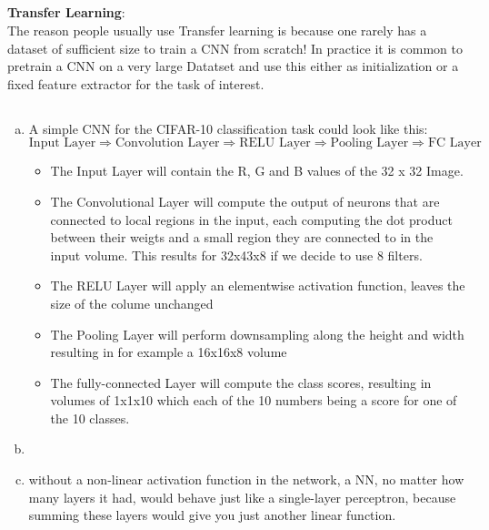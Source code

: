 \documentclass[12pt]{article}
\begin{document}
\subsection{ }

\textbf{Transfer Learning}:\\
The reason people usually use Transfer learning is because one rarely has a dataset of sufficient size to train a CNN from scratch! In practice it is common to pretrain a CNN on a very large Datatset and use this either as initialization or a fixed feature extractor for the task of interest.


\subsection{ }
\begin{enumerate}[a)]
    \item 
        A simple CNN for the CIFAR-10 classification task could look like this:
        $$ \text{Input Layer} \Rightarrow \text{Convolution Layer} \Rightarrow \text{RELU Layer} \Rightarrow \text{Pooling Layer} \Rightarrow \text{FC Layer}$$

        \begin{itemize}
            \item 
                The Input Layer will contain the R, G and B values of the 32 x 32 Image. 
            \item
                The Convolutional Layer will compute the output of neurons that are connected to local regions in the input, each computing the dot product between their weigts and a small region they are connected to in the input volume. This results for 32x43x8 if we decide to use 8 filters.
            \item
                The RELU Layer will apply an elementwise activation function, leaves the size of the colume unchanged
            \item
                The Pooling Layer will perform downsampling along the height and width resulting in for example a 16x16x8 volume
            \item
                The fully-connected Layer will compute the class scores, resulting in volumes of 1x1x10 which each of the 10 numbers being a score for one of the 10 classes.
        \end{itemize}

    \item


    \item
        without a non-linear activation function in the network, a NN, no matter how many layers it had, would behave just like a single-layer perceptron, because summing these layers would give you just another linear function.\\


\end{enumerate}
\end{document}
